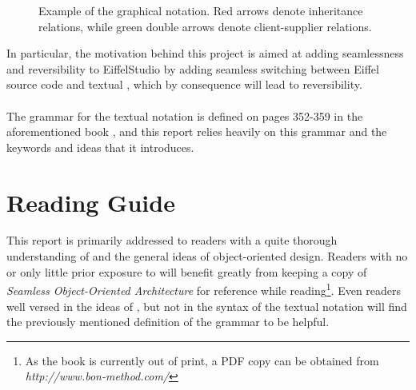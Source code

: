 \begin{figure}[H]
    \centerline{}
    \caption[Example of the graphical \bon{} notation]{Example of the graphical \bon{} notation. Red arrows denote inheritance relations, while green double arrows denote client-supplier relations.}
    \label{fig:context-classes}
\end{figure}

In particular, the motivation behind this project is aimed at adding seamlessness and reversibility to EiffelStudio by adding seamless switching between Eiffel source code and textual \bon{}, which by consequence will lead to reversibility.

\paragraph{}
The grammar for the textual \bon{} notation is defined on pages 352-359 in the aforementioned book \cite{walden1995}, and this report relies heavily on this grammar and the keywords and ideas that it introduces.

\section{Reading Guide}
This report is primarily addressed to readers with a quite thorough understanding of \bon{} and the general ideas of object-oriented design. Readers with no or only little prior exposure to \bon{} will benefit greatly from keeping a copy of \textit{Seamless Object-Oriented Architecture} for reference while reading\footnote{As the book is currently out of print, a PDF copy can be obtained from \textit{http://www.bon-method.com/}}. Even readers well versed in the ideas of \bon{}, but not in the syntax of the textual notation will find the previously mentioned definition of the grammar to be helpful.

